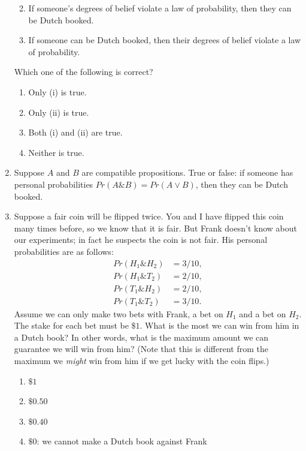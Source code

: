 \documentclass[justified]{tufte-book}
\providecommand{\tightlist}{%
  \setlength{\itemsep}{0pt}\setlength{\parskip}{0pt}}
\renewcommand{\wedge}{\mathbin{\&}}
\newcommand{\p}{Pr}
\theoremstyle{definition}
\theoremstyle{definition}
\theoremstyle{definition}
\theoremstyle{definition}
\theoremstyle{remark}
\begin{document}
\begin{enumerate}
  \begin{enumerate}
  \def\labelenumii{\roman{enumii}.}
  \tightlist
  \item
    If someone's degrees of belief violate a law of probability, then they can be Dutch booked.
  \item
    If someone can be Dutch booked, then their degrees of belief violate a law of probability.
  \end{enumerate}

  Which one of the following is correct?

  \begin{enumerate}
  \def\labelenumii{\alph{enumii}.}
  \tightlist
  \item
    Only (i) is true.
  \item
    Only (ii) is true.
  \item
    Both (i) and (ii) are true.
  \item
    Neither is true.
  \end{enumerate}
\item
  Suppose \(A\) and \(B\) are compatible propositions. True or false: if someone has personal probabilities \(\p(A \wedge B) = \p(A \vee B)\), then they can be Dutch booked.
\item
  Suppose a fair coin will be flipped twice. You and I have flipped this coin many times before, so we know that it is fair. But Frank doesn't know about our experiments; in fact he suspects the coin is not fair. His personal probabilities are as follows:
  \begin{align*}
  \p(H_1 \wedge H_2) &= 3/10, \\
  \p(H_1 \wedge T_2) &= 2/10, \\
  \p(T_1 \wedge H_2) &= 2/10, \\
  \p(T_1 \wedge T_2) &= 3/10.
  \end{align*}
  Assume we can only make two bets with Frank, a bet on \(H_1\) and a bet on \(H_2\). The stake for each bet must be \(\$1\). What is the most we can win from him in a Dutch book? In other words, what is the maximum amount we can guarantee we will win from him? (Note that this is different from the maximum we \emph{might} win from him if we get lucky with the coin flips.)

  \begin{enumerate}
  \def\labelenumii{\alph{enumii}.}
  \tightlist
  \item
    \(\$1\)
  \item
    \(\$0.50\)
  \item
    \(\$0.40\)
  \item
    \(\$0\): we cannot make a Dutch book against Frank
  \end{enumerate}
\end{enumerate}
\end{document}
